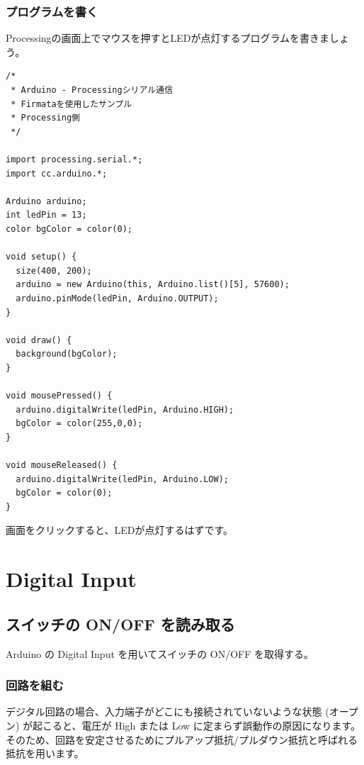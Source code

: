 \documentclass[11pt,a4paper]{jarticle}
\begin{document}
\subsubsection*{プログラムを書く}
Processingの画面上でマウスを押すとLEDが点灯するプログラムを書きましょう。
\begin{lstlisting}
/*
 * Arduino - Processingシリアル通信
 * Firmataを使用したサンプル
 * Processing側
 */
 
import processing.serial.*;
import cc.arduino.*;
 
Arduino arduino;
int ledPin = 13;
color bgColor = color(0);
 
void setup() {
  size(400, 200);
  arduino = new Arduino(this, Arduino.list()[5], 57600);
  arduino.pinMode(ledPin, Arduino.OUTPUT);
}
 
void draw() {
  background(bgColor);
}
 
void mousePressed() {
  arduino.digitalWrite(ledPin, Arduino.HIGH);
  bgColor = color(255,0,0);
}
 
void mouseReleased() {
  arduino.digitalWrite(ledPin, Arduino.LOW);
  bgColor = color(0);
}
\end{lstlisting}
画面をクリックすると、LEDが点灯するはずです。

\section{Digital Input}
\subsection{スイッチの ON/OFF を読み取る}
Arduino の Digital Input を用いてスイッチの ON/OFF を取得する。

\subsubsection*{回路を組む}
デジタル回路の場合、入力端子がどこにも接続されていないような状態 (オープン) が起こると、電圧が High または Low に定まらず誤動作の原因になります。
そのため、回路を安定させるためにプルアップ抵抗/プルダウン抵抗と呼ばれる抵抗を用います。
\end{document}
